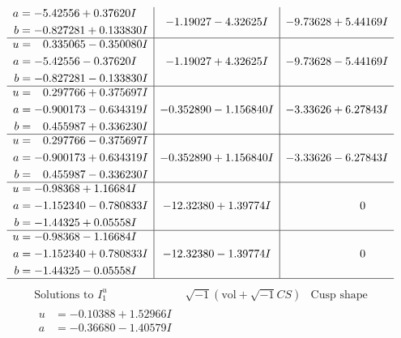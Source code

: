 \documentclass[1p]{elsarticle_modified}
\theoremstyle{definition}
\newcommand{\I}{\sqrt{-1}}
\begin{document}
$$\begin{array}{c|c|c}
\begin{aligned}
a &= -5.42556 + 0.37620 I \\
b &= -0.827281 + 0.133830 I\end{aligned}
 & -1.19027 - 4.32625 I & -9.73628 + 5.44169 I \\ \hline\begin{aligned}
u &= \phantom{-}0.335065 - 0.350080 I \\
a &= -5.42556 - 0.37620 I \\
b &= -0.827281 - 0.133830 I\end{aligned}
 & -1.19027 + 4.32625 I & -9.73628 - 5.44169 I \\ \hline\begin{aligned}
u &= \phantom{-}0.297766 + 0.375697 I \\
a &= -0.900173 - 0.634319 I \\
b &= \phantom{-}0.455987 + 0.336230 I\end{aligned}
 & -0.352890 - 1.156840 I & -3.33626 + 6.27843 I \\ \hline\begin{aligned}
u &= \phantom{-}0.297766 - 0.375697 I \\
a &= -0.900173 + 0.634319 I \\
b &= \phantom{-}0.455987 - 0.336230 I\end{aligned}
 & -0.352890 + 1.156840 I & -3.33626 - 6.27843 I \\ \hline\begin{aligned}
u &= -0.98368 + 1.16684 I \\
a &= -1.152340 - 0.780833 I \\
b &= -1.44325 + 0.05558 I\end{aligned}
 & -12.32380 + 1.39774 I & \phantom{-0.000000 } 0 \\ \hline\begin{aligned}
u &= -0.98368 - 1.16684 I \\
a &= -1.152340 + 0.780833 I \\
b &= -1.44325 - 0.05558 I\end{aligned}
 & -12.32380 - 1.39774 I & \phantom{-0.000000 } 0\\
 \hline 
 \end{array}$$\newpage$$\begin{array}{c|c|c}  
\text{Solutions to }I^u_{1}& \I (\text{vol} + \sqrt{-1}CS) & \text{Cusp shape}\\
 \hline 
\begin{aligned}
u &= -0.10388 + 1.52966 I \\
a &= -0.36680 - 1.40579 I \\

\end{aligned}
\end{array}$$
\end{document}

